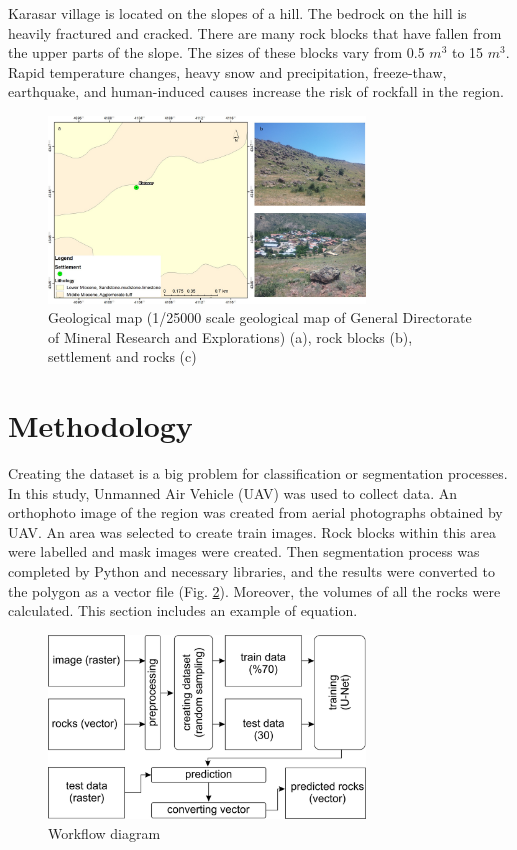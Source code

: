 \documentclass[a4paper,fleqn]{cas-sc}
\begin{document}
Karasar village is located on the slopes of a hill. The bedrock on the hill is heavily fractured and cracked. There are many rock blocks that have fallen from the upper parts of the slope. The sizes of these blocks vary from 0.5 $m^3$ to 15 $m^3$. Rapid temperature changes, heavy snow and precipitation, freeze-thaw, earthquake, and human-induced causes increase the risk of rockfall in the region.
\begin{figure}
	\centering
	\includegraphics[width=0.75\textwidth]{figures/fig2.jpg}
	\caption{ Geological map (1/25000 scale geological map of General Directorate of Mineral Research and Explorations) (a), rock blocks (b), settlement and rocks (c)}
	\label{fig:Figure2}
\end{figure}

\section{Methodology}
Creating the dataset is a big problem for classification or segmentation processes. In this study, Unmanned Air Vehicle (UAV) was used to collect data. An orthophoto image of the region was created from aerial photographs obtained by UAV. An area was selected to create train images. Rock blocks within this area were labelled and mask images were created. Then segmentation process was completed by Python and necessary libraries, and the results were converted to the polygon as a vector file (Fig. \ref{fig:Figure3}). Moreover, the volumes of all the rocks were calculated.
This section includes an example of equation. 
\begin{figure}
	\centering
	\includegraphics[width=0.75\textwidth]{figures/fig3.jpg}
	\caption{ Workflow diagram}
	\label{fig:Figure3}
\end{figure}
\end{document}
